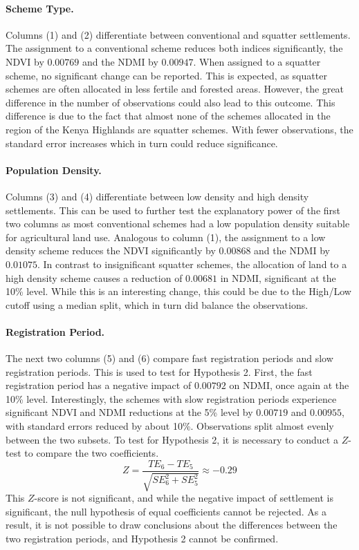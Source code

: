 \paragraph{Scheme Type.}
Columns (1) and (2) differentiate between conventional and squatter settlements.
The assignment to a conventional scheme reduces both indices significantly, the NDVI by $0.00769$ and the NDMI by $0.00947$.
When assigned to a squatter scheme, no significant change can be reported.
This is expected, as squatter schemes are often allocated in less fertile and forested areas.
However, the great difference in the number of observations could also lead to this outcome.
This difference is due to the fact that almost none of the schemes allocated in the region of the Kenya Highlands are squatter schemes.
With fewer observations, the standard error increases which in turn could reduce significance.

\paragraph{Population Density.}
Columns (3) and (4) differentiate between low density and high density settlements.
This can be used to further test the explanatory power of the first two columns as most conventional schemes had a low population density suitable for agricultural land use.
Analogous to column (1), the assignment to a low density scheme reduces the NDVI significantly by $0.00868$ and the NDMI by $0.01075$.
In contrast to insignificant squatter schemes, the allocation of land to a high density scheme causes a reduction of $0.00681$ in NDMI, significant at the 10\% level.
While this is an interesting change, this could be due to the High/Low cutoff using a median split, which in turn did balance the observations.

\paragraph{Registration Period.}
The next two columns (5) and (6) compare fast registration periods and slow registration periods.
This is used to test for Hypothesis 2.
First, the fast registration period has a negative impact of $0.00792$ on NDMI, once again at the 10\% level.
Interestingly, the schemes with slow registration periods experience significant NDVI and NDMI reductions at the 5\% level by $0.00719$ and $0.00955$, with standard errors reduced by about 10\%.
Observations split almost evenly between the two subsets.
To test for Hypothesis 2, it is necessary to conduct a $Z$-test to compare the two coefficients.
$$Z = \frac{TE_6 - TE_5}{\sqrt{SE^2_6 + SE^2_5}} \approx -0.29$$
This $Z$-score is not significant, and while the negative impact of settlement is significant, the null hypothesis of equal coefficients cannot be rejected.
As a result, it is not possible to draw conclusions about the differences between the two registration periods, and Hypothesis 2 cannot be confirmed.

